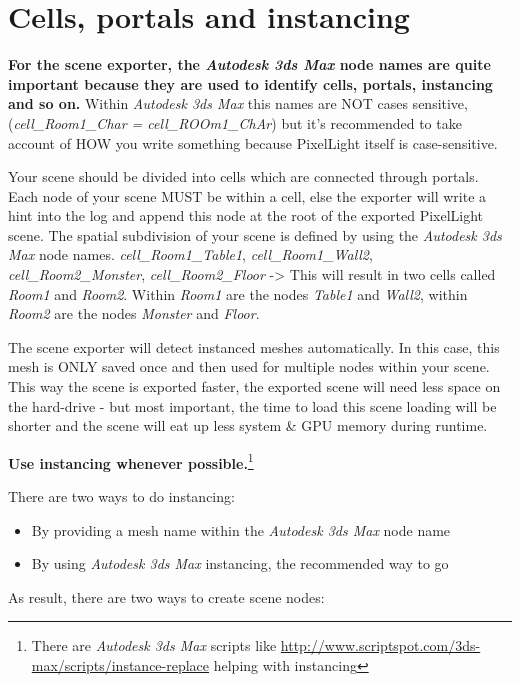 \chapter{Cells, portals and instancing}
\textbf{For the scene exporter, the \emph{Autodesk 3ds Max} node names are quite important because they are used to identify cells, portals, instancing and so on.} Within \emph{Autodesk 3ds Max} this names are NOT cases sensitive, (\emph{cell\_Room1\_Char = cell\_ROOm1\_ChAr}) but it's recommended to take account of HOW you write something because PixelLight itself is case-sensitive.

Your scene should be divided into cells which are connected through portals. Each node of your scene MUST be within a cell, else the exporter will write a hint into the log and append this node at the root of the exported PixelLight scene. The spatial subdivision of your scene is defined by using the \emph{Autodesk 3ds Max} node names. \emph{cell\_Room1\_Table1}, \emph{cell\_Room1\_Wall2}, \emph{cell\_Room2\_Monster}, \emph{cell\_Room2\_Floor} -> This will result in two cells called \emph{Room1} and \emph{Room2}. Within \emph{Room1} are the nodes \emph{Table1} and \emph{Wall2}, within \emph{Room2} are the nodes \emph{Monster} and \emph{Floor}.

The scene exporter will detect instanced meshes automatically. In this case, this mesh is ONLY saved once and then used for multiple nodes within your scene. This way the scene is exported faster, the exported scene will need less space on the hard-drive - but most important, the time to load this scene loading will be shorter and the scene will eat up less system \& GPU memory during runtime.

\textbf{Use instancing whenever possible.}\footnote{There are \emph{Autodesk 3ds Max} scripts like \url{http://www.scriptspot.com/3ds-max/scripts/instance-replace} helping with instancing}

There are two ways to do instancing:

\begin{itemize}
\item{By providing a mesh name within the \emph{Autodesk 3ds Max} node name}
\item{By using \emph{Autodesk 3ds Max} instancing, the recommended way to go}
\end{itemize}

As result, there are two ways to create scene nodes:

